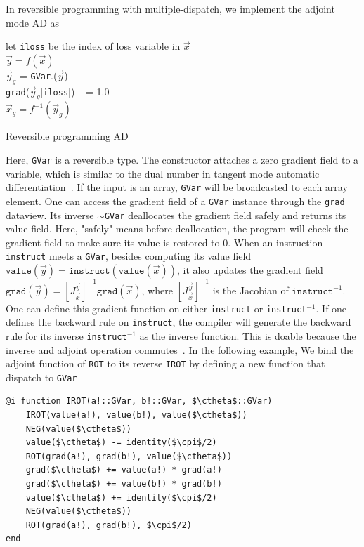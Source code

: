 \documentclass[aps,twocolumn,longbibliography,english,superscriptaddress]{revtex4-1}
\newcommand{\<}{\langle}
\renewcommand{\>}{\rangle}
\newcommand{\vx}{{\vec x}}
\newcommand{\vy}{{\vec y}}
\newcommand{\vvalue}{{\texttt{value}}}
\newcommand{\grad}{{\texttt{grad}}}
\newcommand{\ctheta}{{\color{jlbase}{\rm \theta}}}
\newcommand{\cpi}{{\color{jlbase}{\rm \pi}}}
\theoremstyle{definition}\newtheorem{definition}{\textit{Definition}}
\begin{document}
In reversible programming with multiple-dispatch, we implement the adjoint mode AD as

\begin{algorithm}[H]
    \KwResult{\grad.($\vx_g$)}
    let \texttt{iloss} be the index of loss variable in $\vx$\\
    $\vy = f(\vx)$\\
    $\vy_g$ = \texttt{GVar}.($\vy$)\\
    \grad($\vy_g$[\texttt{iloss}]) += 1.0\\
    $\vx_g= f^{-1}(\vy_g)$
    \caption{Reversible programming AD}\label{alg:ad}
\end{algorithm}

Here, \texttt{GVar} is a reversible type. The constructor attaches a zero gradient field to a variable, which is similar to the dual number in tangent mode automatic differentiation~\cite{Revels2016}. If the input is an array, \texttt{GVar} will be broadcasted to each array element. One can access the gradient field of a \texttt{GVar} instance through the \texttt{grad} dataview. Its inverse \texttt{$\sim$GVar} deallocates the gradient field safely and returns its value field. Here, "safely" means before deallocation, the program will check the gradient field to make sure its value is restored to $0$.
When an instruction \texttt{instruct} meets a \texttt{GVar}, besides computing its value field $\vvalue(\vy) = \texttt{instruct}(\vvalue(\vx))$, it also updates the gradient field $\grad(\vy) = \left[J^{\vy}_{\vx}\right]^{-1} \grad(\vx)$, where $\left[J^{\vy}_{\vx}\right]^{-1}$ is the Jacobian of $\texttt{instruct}^{-1}$. One can define this gradient function on either \texttt{instruct} or \texttt{instruct${}^{-1}$}. If one defines the backward rule on \texttt{instruct}, the compiler will generate the backward rule for its inverse \texttt{instruct${}^{-1}$} as the inverse function. This is doable because the inverse and adjoint operation commutes~\cite{Mcinerney2015}. In the following example, We bind the adjoint function of \texttt{ROT} to its reverse \texttt{IROT} by defining a new function that dispatch to \texttt{GVar}

\begin{minipage}{.44\textwidth}
    \begin{lstlisting}[mathescape=true]
@i function IROT(a!::GVar, b!::GVar, $\ctheta$::GVar)
    IROT(value(a!), value(b!), value($\ctheta$))
    NEG(value($\ctheta$))
    value($\ctheta$) -= identity($\cpi$/2)
    ROT(grad(a!), grad(b!), value($\ctheta$))
    grad($\ctheta$) += value(a!) * grad(a!)
    grad($\ctheta$) += value(b!) * grad(b!)
    value($\ctheta$) += identity($\cpi$/2)
    NEG(value($\ctheta$))
    ROT(grad(a!), grad(b!), $\cpi$/2)
end
\end{lstlisting}
\end{minipage}
\end{document}
